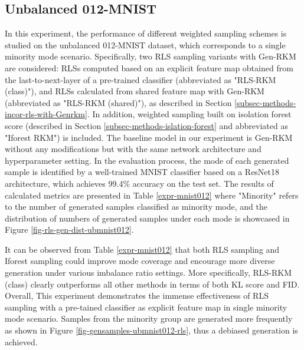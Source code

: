 

\FloatBarrier

\subsection{Unbalanced 012-MNIST}
\label{subsec-expr-ubMNIST012}
In this experiment, the performance of different weighted sampling schemes is studied on the unbalanced 012-MNIST dataset, which corresponds to a single minority mode scenario. Specifically, two RLS sampling variants with Gen-RKM are considered: RLSs computed based on an explicit feature map obtained from the last-to-next-layer of a pre-trained classifier (abbreviated as "RLS-RKM (class)"), and RLSs calculated from shared feature map with Gen-RKM (abbreviated as "RLS-RKM (shared)"), as described in Section \ref{subsec-methods-incor-rls-with-Genrkm}. In addition, weighted sampling built on isolation forest score (described in Section \ref{subsec-methods-islation-forest} and abbreviated as "Iforest RKM") is included. The baseline model in our experiment is Gen-RKM without any modifications but with the same network architecture and hyperparameter setting. In the evaluation process, the mode of each generated sample is identified by a well-trained MNIST classifier based on a ResNet18 architecture, which achieves 99.4\% accuracy on the test set. The results of calculated metrics are presented in Table \ref{expr-mnist012} where "Minority" refers to the number of generated samples classified as minority mode, and the distribution of numbers of generated samples under each mode is showcased in Figure \ref{fig-rls-gen-dist-ubmnist012}.  

It can be observed from Table \ref{expr-mnist012} that both RLS sampling and Iforest sampling could improve mode coverage and encourage more diverse generation under various imbalance ratio settings. More specifically, RLS-RKM (class) clearly outperforms all other methods in terms of both KL score and FID. Overall, This experiment demonstrates the immense effectiveness of RLS sampling with a pre-tained classifier as explicit feature map in single minority mode scenario. Samples from the minority group are generated more frequently as shown in Figure \ref{fig-gensamples-ubmnist012-rls}, thus a debiased generation is achieved.

